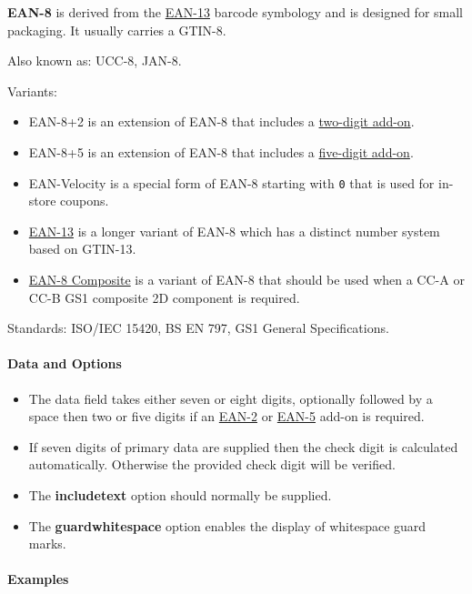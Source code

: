 \textbf{EAN-8} is derived from the \protect\hyperlink{ean-13}{EAN-13}
barcode symbology and is designed for small packaging. It usually
carries a GTIN-8.

Also known as: UCC-8, JAN-8.

Variants:

\begin{itemize}
\tightlist
\item
  EAN-8+2 is an extension of EAN-8 that includes a
  \protect\hyperlink{ean-2}{two-digit add-on}.
\item
  EAN-8+5 is an extension of EAN-8 that includes a
  \protect\hyperlink{ean-5}{five-digit add-on}.
\item
  EAN-Velocity is a special form of EAN-8 starting with \texttt{0} that
  is used for in-store coupons.
\item
  \protect\hyperlink{ean-13}{EAN-13} is a longer variant of EAN-8 which
  has a distinct number system based on GTIN-13.
\item
  \protect\hyperlink{gs1-composite-symbols}{EAN-8 Composite} is a
  variant of EAN-8 that should be used when a CC-A or CC-B GS1 composite
  2D component is required.
\end{itemize}

Standards: ISO/IEC 15420, BS EN 797, GS1 General Specifications.

\hypertarget{data-and-options-1}{%
\paragraph{Data and Options}\label{data-and-options-1}}

\begin{itemize}
\tightlist
\item
  The data field takes either seven or eight digits, optionally followed
  by a space then two or five digits if an
  \protect\hyperlink{ean-2}{EAN-2} or \protect\hyperlink{ean-5}{EAN-5}
  add-on is required.
\item
  If seven digits of primary data are supplied then the check digit is
  calculated automatically. Otherwise the provided check digit will be
  verified.
\item
  The \textbf{includetext} option should normally be supplied.
\item
  The \textbf{guardwhitespace} option enables the display of whitespace
  guard marks.
\end{itemize}

\hypertarget{examples-1}{%
\paragraph{Examples}\label{examples-1}}

